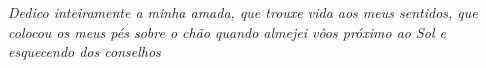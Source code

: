 \textit{Dedico inteiramente a minha amada, que trouxe vida aos meus sentidos, que colocou os meus pés sobre o chão quando almejei vôos próximo ao Sol e esquecendo dos conselhos}
